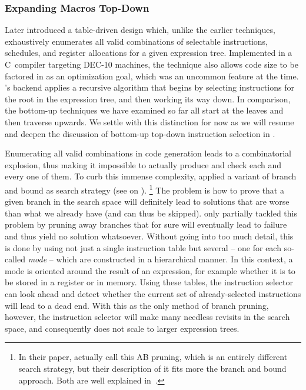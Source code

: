 \subsubsection{Expanding Macros Top-Down}

Later \textcite{KrummeAckley:1982} introduced a table-driven design which,
unlike the earlier techniques, exhaustively enumerates all valid combinations of
selectable \glspl{instruction}, schedules, and \glspl{register allocation} for a
given \gls{expression tree}.
%
Implemented in a \gls{C}~\gls{compiler} targeting \gls{DEC-10} machines, the
technique also allows code size to be factored in as an optimization goal, which
was an uncommon feature at the time.
%
\citeauthor{KrummeAckley:1982}'s \gls{backend} applies a recursive algorithm
that begins by selecting \glspl{instruction} for the \gls{root} in the
\gls{expression tree}, and then working its way down.
%
In comparison, the bottom-up techniques we have examined so far all start at the
leaves and then traverse upwards.
%
We settle with this distinction for now as we will resume and deepen the
discussion of bottom-up \versus top-down \gls{instruction selection} in
.

Enumerating all valid combinations in code generation leads to a combinatorial
explosion, thus making it impossible to actually produce and check each and
every one of them.
%
To curb this immense complexity, \citeauthor{KrummeAckley:1982} applied a
variant of \gls{branch and bound} as \gls{search} strategy (see
 on ).\!
%
\footnote{%
  In their paper, \citeauthor{KrummeAckley:1982} actually call this \gls{AB
    pruning}, which is an entirely different search strategy, but their
  description of it fits more the \gls{branch and bound} approach.
  Both are well explained in~\cite{RussellNorvig:2010}.%
}
%
The problem is how to prove that a given branch in the \gls{search space} will
definitely lead to solutions that are worse than what we already have (and can
thus be skipped).
%
\citeauthor{KrummeAckley:1982} only partially tackled this problem by pruning
away branches that for sure will eventually lead to failure and thus yield no
solution whatsoever.
%
Without going into too much detail, this is done by using not just a single
\gls{instruction} table but several -- one for each so-called \emph{mode} --
which are constructed in a hierarchical manner.
%
In this context, a mode is oriented around the result of an expression, for
example whether it is to be stored in a \gls{register} or in memory.
%
Using these tables, the \gls{instruction selector} can look ahead and detect
whether the current set of already-selected \glspl{instruction} will lead to a
dead end.
%
With this as the only method of branch pruning, however, the \gls{instruction
  selector} will make many needless revisits in the \gls{search space}, and
consequently does not scale to larger \glspl{expression tree}.


